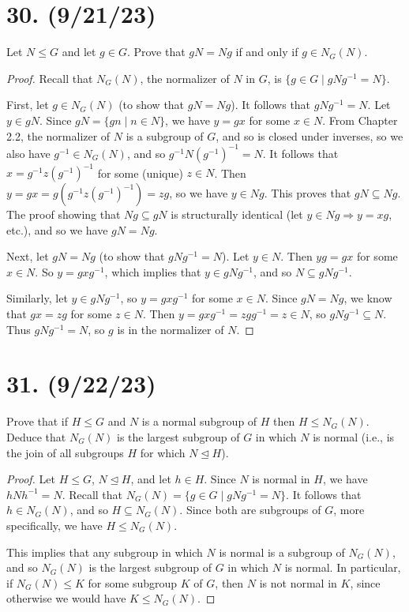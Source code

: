 \documentclass{article}
\begin{document}
\section*{30. (9/21/23)}

Let $N \leq G$ and let $g \in G$. Prove that $gN = Ng$ if and only if $g \in N_G(N)$.

\begin{proof}
    Recall that $N_G(N)$, the normalizer of $N$ in $G$, is $\{ g \in G \mid gNg^{-1} = N \}$.

    First, let $g \in N_G(N)$ (to show that $gN = Ng$). It follows that $gNg^{-1} = N$. Let $y \in gN$. Since $gN = \{ gn \mid n \in N \}$, we have $y = gx$ for some $x \in N$. From Chapter 2.2, the normalizer of $N$ is a subgroup of $G$, and so is closed under inverses, so we also have $g^{-1} \in N_G(N)$, and so $g^{-1}N(g^{-1})^{-1} = N$. It follows that $x = g^{-1}z(g^{-1})^{-1}$ for some (unique) $z \in N$. Then $y = gx = g(g^{-1}z(g^{-1})^{-1}) = zg$, so we have $y \in Ng$. This proves that $gN \subseteq Ng$. The proof showing that $Ng \subseteq gN$ is structurally identical (let $y \in Ng \Rightarrow y = xg$, etc.), and so we have $gN = Ng$.

    Next, let $gN = Ng$ (to show that $gNg^{-1} = N$). Let $y \in N$. Then $yg = gx$ for some $x \in N$. So $y = gxg^{-1}$, which implies that $y \in gNg^{-1}$, and so $N \subseteq gNg^{-1}$.
    
    Similarly, let $y \in gNg^{-1}$, so $y = gxg^{-1}$ for some $x \in N$. Since $gN = Ng$, we know that $gx = zg$ for some $z \in N$. Then $y = gxg^{-1} = zgg^{-1} = z \in N$, so $gNg^{-1} \subseteq N$. Thus $gNg^{-1} = N$, so $g$ is in the normalizer of $N$.
\end{proof}

\section*{31. (9/22/23)}

Prove that if $H \leq G$ and $N$ is a normal subgroup of $H$ then $H \leq N_G(N)$. Deduce that $N_G(N)$ is the largest subgroup of $G$ in which $N$ is normal (i.e., is the join of all subgroups $H$ for which $N \unlhd H$).

\begin{proof}
    Let $H \leq G$, $N \unlhd H$, and let $h \in H$. Since $N$ is normal in $H$, we have $hNh^{-1} = N$. Recall that $N_G(N) = \{ g \in G \mid gNg^{-1} = N \}$. It follows that $h \in N_G(N)$, and so $H \subseteq N_G(N)$. Since both are subgroups of $G$, more specifically, we have $H \leq N_G(N)$.

    This implies that any subgroup in which $N$ is normal is a subgroup of $N_G(N)$, and so $N_G(N)$ is the largest subgroup of $G$ in which $N$ is normal. In particular, if $N_G(N) \leq K$ for some subgroup $K$ of $G$, then $N$ is not normal in $K$, since otherwise we would have $K \leq N_G(N)$.
\end{proof}
\end{document}
